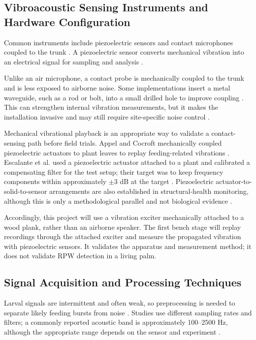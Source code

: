 \documentclass[12pt,a4paper,oneside]{memoir}
\newcommand{\earlierrevision}[1]{#1}
\newcommand{\newrevision}[1]{#1}
\begin{document}
\subsection{Vibroacoustic Sensing Instruments and Hardware Configuration}

\earlierrevision{Common instruments include piezoelectric sensors and contact microphones coupled to the trunk \cite{pinhas2008,karar2021}. A piezoelectric sensor converts mechanical vibration into an electrical signal for sampling and analysis \cite{karar2021,saranya2025}.}

\earlierrevision{Unlike an air microphone, a contact probe is mechanically coupled to the trunk and is less exposed to airborne noise. Some implementations insert a metal waveguide, such as a rod or bolt, into a small drilled hole to improve coupling \cite{karar2021}. This can strengthen internal vibration measurements, but it makes the installation invasive and may still require site-specific noise control \cite{karar2021,sutanto2023}.}

\newrevision{Mechanical vibrational playback is an appropriate way to validate a contact-sensing path before field trials. Appel and Cocroft mechanically coupled piezoelectric actuators to plant leaves to replay feeding-related vibrations \cite{appel2014}. Escalante et al. used a piezoelectric actuator attached to a plant and calibrated a compensating filter for the test setup; their target was to keep frequency components within approximately $\pm3$ dB at the target \cite{escalante2024}. Piezoelectric actuator-to-solid-to-sensor arrangements are also established in structural-health monitoring, although this is only a methodological parallel and not biological evidence \cite{agis2020}.}

\newrevision{Accordingly, this project will use a vibration exciter mechanically attached to a wood plank, rather than an airborne speaker. The first bench stage will replay recordings through the attached exciter and measure the propagated vibration with piezoelectric sensors. It validates the apparatus and measurement method; it does not validate RPW detection in a living palm.}

\subsection{Signal Acquisition and Processing Techniques}

\earlierrevision{Larval signals are intermittent and often weak, so preprocessing is needed to separate likely feeding bursts from noise \cite{karar2021,saranya2025}. Studies use different sampling rates and filters; a commonly reported acoustic band is approximately 100--2500 Hz, although the appropriate range depends on the sensor and experiment \cite{karar2022,pinhas2008,saranya2025}.}
\end{document}
